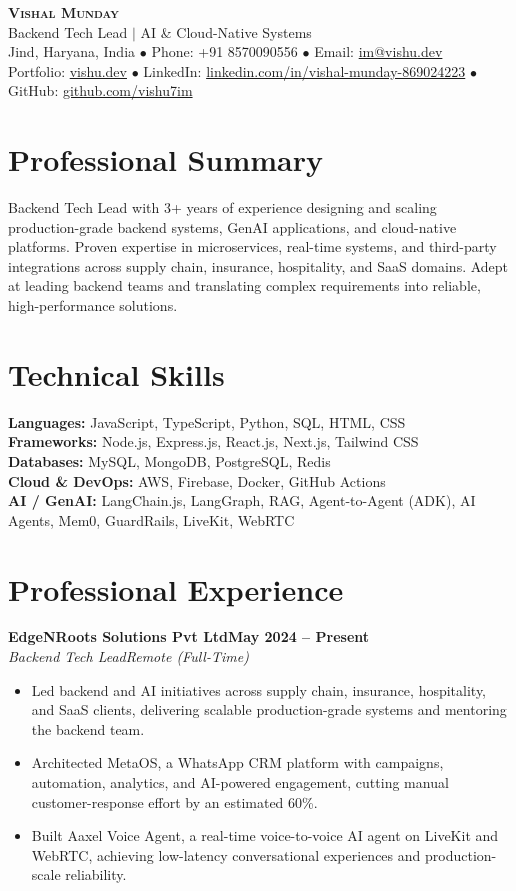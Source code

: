 \documentclass[10pt,a4paper]{article}
\newcommand{\role}[4]{%
  \textbf{#1}\hfill\textbf{#3}\\
  \textit{#2}\hfill\textit{#4}\vspace{2pt}%
}
\begin{document}
\begin{center}
  {\LARGE \scshape \textbf{Vishal Munday}}\\[3pt]
  {\normalsize Backend Tech Lead $|$ AI \& Cloud-Native Systems}\\[4pt]
  \small
  Jind, Haryana, India $\bullet$ Phone: +91 8570090556 $\bullet$
  Email: \href{mailto:im@vishu.dev}{im@vishu.dev}\\
  Portfolio: \href{https://vishu.dev}{vishu.dev} $\bullet$
  LinkedIn: \href{https://linkedin.com/in/vishal-munday-869024223/}{linkedin.com/in/vishal-munday-869024223} $\bullet$
  GitHub: \href{https://github.com/vishu7im}{github.com/vishu7im}
\end{center}

\section{Professional Summary}
Backend Tech Lead with 3+ years of experience designing and scaling production-grade backend systems, GenAI applications, and cloud-native platforms. Proven expertise in microservices, real-time systems, and third-party integrations across supply chain, insurance, hospitality, and SaaS domains. Adept at leading backend teams and translating complex requirements into reliable, high-performance solutions.

\section{Technical Skills}
\textbf{Languages:} JavaScript, TypeScript, Python, SQL, HTML, CSS\\
\textbf{Frameworks:} Node.js, Express.js, React.js, Next.js, Tailwind CSS\\
\textbf{Databases:} MySQL, MongoDB, PostgreSQL, Redis\\
\textbf{Cloud \& DevOps:} AWS, Firebase, Docker, GitHub Actions\\
\textbf{AI / GenAI:} LangChain.js, LangGraph, RAG, Agent-to-Agent (ADK), AI Agents, Mem0, GuardRails, LiveKit, WebRTC

\section{Professional Experience}
\role{EdgeNRoots Solutions Pvt Ltd}{Backend Tech Lead}{May 2024 -- Present}{Remote (Full-Time)}
\begin{itemize}
  \item Led backend and AI initiatives across supply chain, insurance, hospitality, and SaaS clients, delivering scalable production-grade systems and mentoring the backend team.
  \item Architected MetaOS, a WhatsApp CRM platform with campaigns, automation, analytics, and AI-powered engagement, cutting manual customer-response effort by an estimated 60\%.
  \item Built Aaxel Voice Agent, a real-time voice-to-voice AI agent on LiveKit and WebRTC, achieving low-latency conversational experiences and production-scale reliability.
\end{itemize}
\end{document}
